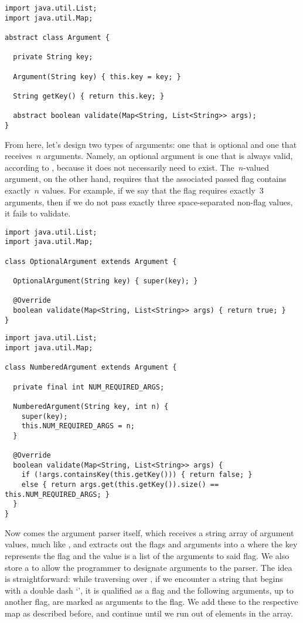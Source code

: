 \enlargethispage{-3\baselineskip}
\begin{lstlisting}[language=MyJava]
import java.util.List;
import java.util.Map;

abstract class Argument {

  private String key;

  Argument(String key) { this.key = key; }

  String getKey() { return this.key; }

  abstract boolean validate(Map<String, List<String>> args);
}
\end{lstlisting}

From here, let's design two types of arguments: one that is optional and one that receives~$n$ arguments. Namely, an optional argument is one that is always valid, according to , because it does not necessarily need to exist. The~$n$-valued argument, on the other hand, requires that the associated passed flag contains exactly~$n$ values. For example, if we say that the  flag requires exactly~$3$ arguments, then if we do not pass exactly three space-separated non-flag values, it fails to validate.


\begin{lstlisting}[language=MyJava]
import java.util.List;
import java.util.Map;

class OptionalArgument extends Argument {

  OptionalArgument(String key) { super(key); }

  @Override
  boolean validate(Map<String, List<String>> args) { return true; }
}
\end{lstlisting}

\begin{lstlisting}[language=MyJava]
import java.util.List;
import java.util.Map;

class NumberedArgument extends Argument {

  private final int NUM_REQUIRED_ARGS;

  NumberedArgument(String key, int n) {
    super(key);
    this.NUM_REQUIRED_ARGS = n;
  }

  @Override
  boolean validate(Map<String, List<String>> args) {
    if (!args.containsKey(this.getKey())) { return false; } 
    else { return args.get(this.getKey()).size() == this.NUM_REQUIRED_ARGS; }
  }
}
\end{lstlisting}

Now comes the argument parser itself, which receives a string array of argument values, much like , and extracts out the flags and arguments into a  where the key represents the flag and the value is a list of the arguments to said flag. We also store a  to allow the programmer to designate arguments to the parser. The idea is straightforward: while traversing over , if we encounter a string that begins with a double dash `\ttt{--}', it is qualified as a flag and the following arguments, up to another flag, are marked as arguments to the flag. We add these to the respective map as described before, and continue until we run out of elements in the array.

